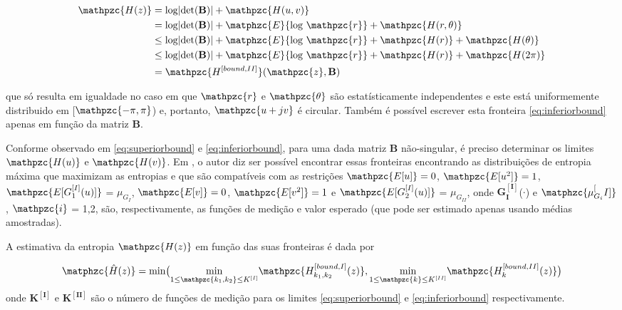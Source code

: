         \begin{equation}\label{eq:inferiorbound}
        \begin{split}
            \mathpzc{H(z)} & =\text{log}|\text{det}(\mathbf{B})| + \mathpzc{H(u,v)} \\
                          &  = \text{log}|\text{det}(\mathbf{B})| + \matphzc{E}\{\text{log } \mathpzc{r}\} + \mathpzc{H(r,\theta)} \\
                          & \leq \text{log}|\text{det}(\mathbf{B})| + \matphzc{E}\{\text{log } \mathpzc{r}\} + \mathpzc{H(r)} + \mathpzc{H(\theta)} \\
                          & \leq \text{log}|\text{det}(\mathbf{B})| + \matphzc{E}\{\text{log } \mathpzc{r}\} + \mathpzc{H(r)} + \mathpzc{H(2\pi)} \\
                          & = \mathpzc{H^{[bound,II]}}(\mathpzc{z},\mathbf{B})
            \end{split}
        \end{equation}
        
    que só resulta em igualdade no caso em que $\mathpzc{r}$ e $\mathpzc{\theta}$ são estatísticamente independentes e este está uniformemente distribuido em [$\mathpzc{-\pi,\pi}$) e, portanto, $\mathpzc{u + jv}$ é circular. Também é possível escrever esta fronteira \ref{eq:inferiorbound} apenas em função da matriz $\mathbf{B}$. 
    
    Conforme observado em \ref{eq:superiorbound} e \ref{eq:inferiorbound}, para uma dada matriz $\mathbf{B}$ não-singular, é preciso determinar os limites $\mathpzc{H(u)}$ e  $\mathpzc{H(v)}$. Em \cite{entropymaximum}, o autor diz ser possível encontrar essas fronteiras encontrando as distribuições de entropia máxima que maximizam as entropias e que são compatíveis com as restrições $\mathpzc{E[u]} = 0$, $\mathpzc{E[u^2]} = 1$, $\mathpzc{E[G_1^{[I]}(u)]}$ = $\mu_{G_I}$, $\mathpzc{E[v]} = 0$, $\mathpzc{E[v^2]} = 1$ e $\mathpzc{E[G_2^{[I]}(u)]}$ = $\mu_{G_{II}}$, onde $\mathbf{G_I^{[I]}}$($\cdot$) e $\matphzc{\mu_{G_i}^[I]}$, $\mathpzc{i}$ = 1,2, são, respectivamente, as funções de medição e valor esperado (que pode ser estimado apenas usando médias amostradas).
    
    A estimativa da entropia $\mathpzc{H(z)}$ em função das suas fronteiras é dada por
    
    \begin{equation}
        \matphzc{\hat{H}(z)} = \text{min}\big(
        \underset{1\leq\mathpzc{k_1,k_2}\leq K^{[I]}}{\mathrm{min}}\mathpzc{H_{k_1,k_2}^{[bound,I]}(z)}
        ,
        \underset{1 \leq \mathpzc{k}\leq K^{[II]}}{\mathrm{min}}\mathpzc{H_k^{[bound,II]}(z)}
        \big)
    \end{equation}
    \bigskip
    onde $\mathbf{K^{[I]}}$ e $\mathbf{K^{[II]}}$ são o número de funções de medição para os limites \ref{eq:superiorbound} e \ref{eq:inferiorbound} respectivamente.
    
